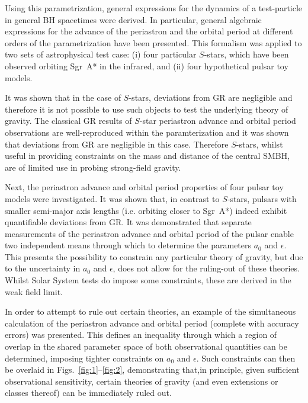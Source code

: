 \documentclass[a4paper,aps,twocolumn,showpacs,showkeys,nofootinbib,preprintnumbers,superscriptaddress,amsmath,amssymb,amsfonts]{revtex4-1}
\begin{document}
Using this parametrization, general expressions for the
dynamics of a test-particle in general BH spacetimes were derived. 
In particular, general algebraic expressions for the advance
of the periastron and the orbital period at different orders of the
parametrization have been presented.
This formalism was applied to two sets of astrophysical test case:
(i) four particular $S$-stars, which have been observed orbiting Sgr~A*
in the infrared, and (ii) four hypothetical pulsar toy models.

It was shown that in the case of $S$-stars, deviations from GR are negligible
and therefore it is not possible to use such objects to test the underlying
theory of gravity.
The classical GR results of $S$-star periastron advance and orbital
period observations are well-reproduced within the paramterization and
it was shown that deviations from GR are negligible in this case.
Therefore $S$-stars, whilst useful in providing constraints on the mass
and distance of the central SMBH, are of limited use in probing
strong-field gravity.

Next, the periastron advance and orbital period properties of four pulsar toy
models were investigated.
It was shown that, in contrast to $S$-stars, pulsars with smaller semi-major
axis lengths (i.e. orbiting closer to Sgr~A*) indeed exhibit quantifiable
deviations from GR.
It was demonstrated that separate measurements of the periastron advance
and orbital period of the pulsar enable two independent means through which
to determine the parameters $a_{0}$ and $\epsilon$.
This presents the possibility to constrain any particular theory of gravity,
but due to the uncertainty in $a_{0}$ and $\epsilon$, does not
allow for the ruling-out of these theories. 
Whilst Solar System tests do impose some constraints, these are derived
in the weak field limit.

In order to attempt to rule out certain theories, an example of the simultaneous
calculation of the periastron advance and orbital period (complete with accuracy errors)
was presented.
This defines an inequality through which a region of overlap in the shared
parameter space of both observational quantities can be determined,
imposing tighter constraints on $a_{0}$ and $\epsilon$.
Such constraints can then be overlaid in Figs.~\ref{fig:1}--\ref{fig:2},
demonstrating that,in principle, given sufficient observational sensitivity,
certain theories of gravity (and even extensions or classes thereof) can
be immediately ruled out.
\end{document}
